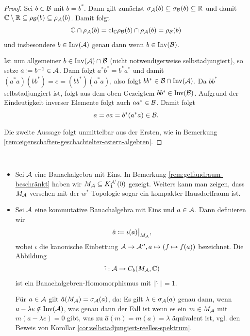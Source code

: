 \begin{proof}
    Sei $b \in \mathcal{B}$ mit $b = b^*$. Dann gilt zunächst $ \sigma_{\mathcal{A}}(b) \subseteq \sigma_{\mathcal{B}}(b) \subseteq \mathbb{R}$ und damit $ \mathbb{C} \setminus \mathbb{R} \subseteq \rho_{\mathcal{B}}(b) \subseteq \rho_{\mathcal{A}}(b) $.
    Damit folgt
    $$ \mathbb{C} \cap \rho_{\mathcal{A}}(b) = \mathrm{cl}_{\mathbb{C}} \rho_{\mathcal{B}}(b) \cap \rho_{\mathcal{A}}(b) = \rho_{\mathcal{B}} (b) $$
    und insbesondere $b \in \operatorname*{Inv}(\mathcal{A})$ genau dann wenn $b \in \operatorname*{Inv}(\mathcal{B})$.

    Ist nun allgemeiner $b \in \operatorname*{Inv}(\mathcal{A}) \cap \mathcal{B}$ (nicht notwendigerweise selbstadjungiert), so setze $a \coloneqq b^{-1} \in \mathcal{A}$. Dann folgt $a^* b^* = b^* a^*$ und damit $(a^* a)(b b^*) = e = (b b^*)(a^* a)$, also folgt $b b^* \in \mathcal{B} \cap \operatorname*{Inv}(\mathcal{A})$. Da $b b^*$ selbstadjungiert ist, folgt aus dem oben Gezeigtem $b b^* \in \operatorname*{Inv}(\mathcal{B})$. Aufgrund der Eindeutigkeit inverser Elemente folgt auch $a a^* \in \mathcal{B}$. Damit folgt
    $$ a = ea = b^* (a^* a) \in \mathcal{B}. $$

    Die zweite Aussage folgt unmittelbar aus der Ersten, wie in Bemerkung \ref{rem:eigenschaften-geschachtelter-cstern-algebren}.
\end{proof}

\begin{remark} {\ }
    \begin{itemize}
        \item Sei $\mathcal{A}$ eine Banachalgebra mit Eins. In Bemerkung \ref{rem:gelfandraum-beschränkt} haben wir $M_{\mathcal{A}} \subseteq K_1^{\mathcal{A}'}(0)$ gezeigt. Weiters kann man zeigen, dass $M_{\mathcal{A}}$ versehen mit der $w^*$-Topologie sogar ein kompakter Hausdorffraum ist.
        \item Sei $\mathcal{A}$ eine kommutative Banachalgebra mit Eins und $a \in \mathcal{A}$. Dann definieren wir
        $$ \hat{a} \coloneqq  \restr{\iota(a)}{M_\Aa}, $$
        wobei $\iota$ die kanonische Einbettung $\mathcal{A} \to \mathcal{A}'', a \mapsto (f \mapsto f(a)) $ bezeichnet. Die Abbildung
        $$ \hat{\cdot} : \mathcal{A} \to C_b(M_{\mathcal{A}}, \mathbb{C}) $$
        ist ein Banachalgebren-Homomorphismus mit $\Vert \hat{\cdot} \Vert = 1$.

        Für $a \in \mathcal{A}$ gilt $\hat{a}(M_{\mathcal{A}}) = \sigma_{\mathcal{A}}(a)$, da: Es gilt $\lambda \in \sigma_{\mathcal{A}}(a)$ genau dann, wenn $a - \lambda e \notin \operatorname*{Inv}(\mathcal{A})$, was genau dann der Fall ist wenn es ein $m \in M_{\mathcal{A}}$ mit $m(a - \lambda e) = 0$ gibt, was zu $\hat{a}(m) = m(a) = \lambda$ äquivalent ist, vgl. den Beweis von Korollar \ref{cor:selbstadjungiert-reelles-spektrum}.
    \end{itemize}
\end{remark}

